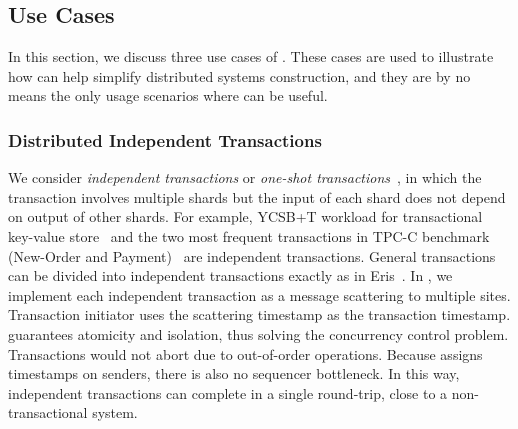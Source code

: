 



\iffalse
\subsection{Use Cases}
\label{subsec:application-scenarios}

In this section, we discuss three use cases of \sys.
These cases are used to illustrate how \sys can help simplify distributed systems construction, and they are by no means the only usage scenarios where \sys can be useful.

\subsubsection{Distributed Independent Transactions}
\label{subsec:transactional-kvs}
We consider \emph{independent transactions} or \emph{one-shot transactions}~\cite{kallman2008h}, in which the transaction involves multiple shards but the input of each shard does not depend on output of other shards.
For example, YCSB+T workload for transactional key-value store~\cite{dey2014ycsbt} and the two most frequent transactions in TPC-C benchmark (New-Order and Payment)~\cite{tpcc} are independent transactions.
General transactions can be divided into independent transactions exactly as in Eris~\cite{eris}.
In \sys, we implement each independent transaction as a message scattering to multiple sites.
Transaction initiator uses the scattering timestamp as the transaction timestamp.
\sys guarantees atomicity and isolation, thus solving the concurrency control problem.
Transactions would not abort due to out-of-order operations.
Because \sys assigns timestamps on senders, there is also no sequencer bottleneck.
In this way, independent transactions can complete in a single round-trip, close to a non-transactional system.%

